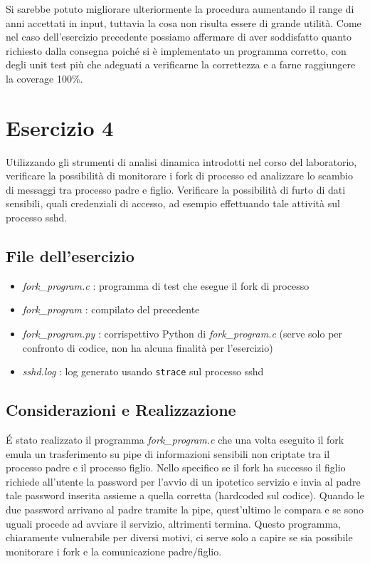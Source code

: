 \documentclass{article}
\newcommand{\py}{Python }
\newcommand{\filename}[1]{\textit{#1}}
\newcommand{\command}[1]{\texttt{#1}}
\begin{document}
Si sarebbe potuto migliorare ulteriormente la procedura aumentando il range di anni accettati in input, tuttavia la cosa non risulta essere di grande utilità.
Come nel caso dell'esercizio precedente possiamo affermare di aver soddisfatto quanto richiesto dalla consegna poiché si è implementato un programma corretto, con degli unit test più che adeguati a verificarne la correttezza e a farne raggiungere la coverage 100\%.

\section{Esercizio 4}

\begin{consegna}
Utilizzando gli strumenti di analisi dinamica introdotti nel corso del laboratorio, verificare la possibilità di monitorare i fork di processo ed analizzare lo scambio di messaggi tra processo padre e figlio.
Verificare la possibilità di furto di dati sensibili, quali credenziali di accesso, ad esempio effettuando tale attività sul processo sshd.
\end{consegna}

\subsection{File dell'esercizio}
\begin{itemize}
    \item \filename{fork\_program.c} : programma di test che esegue il fork di processo
    \item \filename{fork\_program} : compilato del precedente
    \item \filename{fork\_program.py} : corrispettivo \py di \filename{fork\_program.c} (serve solo per confronto di codice, non ha alcuna finalità per l'esercizio)
    \item \filename{sshd.log} : log generato usando \command{strace} sul processo sshd
\end{itemize}

\subsection{Considerazioni e Realizzazione}
\'E stato realizzato il programma \filename{fork\_program.c} che una volta eseguito il fork emula un trasferimento su pipe di informazioni sensibili non criptate tra il processo padre e il processo figlio. Nello specifico se il fork ha successo il figlio richiede all'utente la password per l'avvio di un ipotetico servizio e invia al padre tale password inserita assieme a quella corretta (hardcoded sul codice). Quando le due password arrivano al padre tramite la pipe, quest'ultimo le compara e se sono uguali procede ad avviare il servizio, altrimenti termina. Questo programma, chiaramente vulnerabile per diversi motivi, ci serve solo a capire se sia possibile monitorare i fork e la comunicazione padre/figlio.\\
\end{document}
